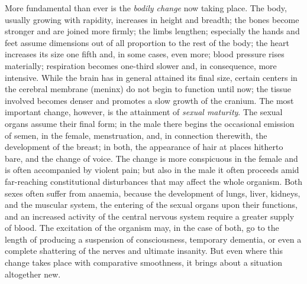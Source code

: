 More fundamental than ever is the \emph{bodily change} now taking place. The body, usually growing with rapidity, increases in height and breadth; the bones become stronger and are joined more firmly; the limbs lengthen; especially the hands and feet assume dimensions out of all proportion to the rest of the body; the heart increases its size one fifth and, in some cases, even more; blood pressure rises materially; respiration becomes one-third slower and, in consequence, more intensive. While the brain has in general attained its final size, certain centers in the cerebral membrane (meninx) do not begin to function until now; the tissue involved becomes denser and promotes a slow growth of the cranium. The most important change, however, is the attainment of \emph{sexual maturity}. The sexual organs assume their final form; in the male there begins the occasional emission of semen, in the female, menstruation, and, in connection therewith, the development of the breast; in both, the appearance of hair at places hitherto bare, and the change of voice. The change is more conspicuous in the female and is often accompanied by violent pain; but also in the male it often proceeds amid far-reaching constitutional disturbances that may affect the whole organism.
Both sexes often suffer from anaemia, because the development of lungs, liver, kidneys, and the muscular system, the entering of the sexual organs upon their functions, and an increased activity of the central nervous system require a greater supply of blood. The excitation of the organism may, in the case of both, go to the length of producing a suspension of consciousness, temporary dementia, or even a complete shattering of the nerves and ultimate insanity. But even where this change takes place with comparative smoothness, it brings about a situation altogether new.

